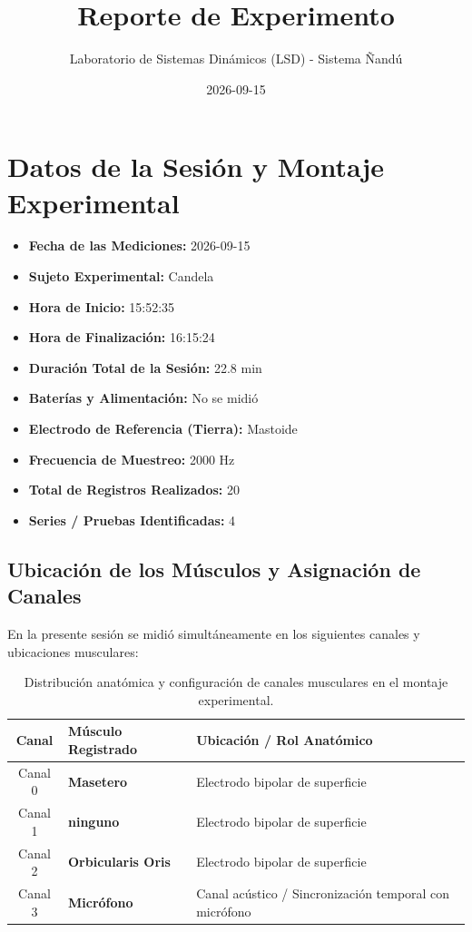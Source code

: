 \documentclass[11pt,a4paper]{article}
\title{\textbf{Reporte de Experimento}}
\author{Laboratorio de Sistemas Dinámicos (LSD) - Sistema Ñandú}
\date{2026-09-15}
\begin{document}
\maketitle

\section{Datos de la Sesión y Montaje Experimental}
\begin{itemize}
    \item \textbf{Fecha de las Mediciones:} 2026-09-15
    \item \textbf{Sujeto Experimental:} Candela
    \item \textbf{Hora de Inicio:} 15:52:35
    \item \textbf{Hora de Finalización:} 16:15:24
    \item \textbf{Duración Total de la Sesión:} 22.8 min
    \item \textbf{Baterías y Alimentación:} No se midió
    \item \textbf{Electrodo de Referencia (Tierra):} Mastoide
    \item \textbf{Frecuencia de Muestreo:} 2000 Hz
    \item \textbf{Total de Registros Realizados:} 20
    \item \textbf{Series / Pruebas Identificadas:} 4
\end{itemize}

\subsection{Ubicación de los Músculos y Asignación de Canales}
En la presente sesión se midió simultáneamente en los siguientes canales y ubicaciones musculares:
\begin{table}[H]
\centering
\begin{tabularx}{\textwidth}{c p{6.5cm} X}
\toprule
\textbf{Canal} & \textbf{Músculo Registrado} & \textbf{Ubicación / Rol Anatómico} \\
\midrule
Canal 0 & \textbf{Masetero} & Electrodo bipolar de superficie \\
Canal 1 & \textbf{ninguno} & Electrodo bipolar de superficie \\
Canal 2 & \textbf{Orbicularis Oris} & Electrodo bipolar de superficie \\
Canal 3 & \textbf{Micrófono} & Canal acústico / Sincronización temporal con micrófono \\
\bottomrule
\end{tabularx}
\caption{Distribución anatómica y configuración de canales musculares en el montaje experimental.}
\end{table}
\end{document}
